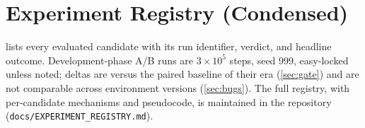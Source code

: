 
\chapter{Experiment Registry (Condensed)}
\label{app:registry}

 lists every evaluated candidate with its run
identifier, verdict, and headline outcome. Development-phase A/B runs are
$3\times10^{5}$ steps, seed 999, easy-locked unless noted; deltas are
versus the paired baseline of their era (\cref{sec:gate}) and are not
comparable across environment versions (\cref{sec:bugs}). The full
registry, with per-candidate mechanisms and pseudocode, is maintained in
the repository (\texttt{docs/EXPERIMENT\_REGISTRY.md}).

